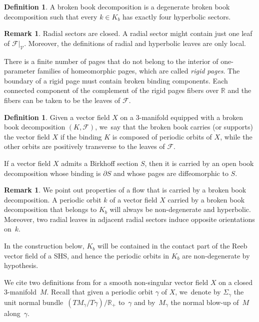 \documentclass[10pt]{amsart}
\newcommand{\threemanifold}{$3$\nobreakdash-mani\-fold\xspace}
\theoremstyle{definition}
\newtheorem{defi}[theorem]{Definition}
\newtheorem{Remark}[theorem]{Remark}
\newcommand\R{\mathbb{R}}
\begin{document}
\begin{defi}\label{defn:BBD2}
A broken book decomposition is a degenerate broken book decomposition such that every $k\in K_b$ has exactly four hyperbolic sectors.
\end{defi}

\begin{Remark}
Radial sectors are closed. A radial sector might contain just one leaf of $\mathcal{F}|_{\mathcal{V}}$. Moreover, the definitions of radial and hyperbolic leaves are only local.
\end{Remark}

There is a finite number of pages that do not belong to the interior of one-parameter families of homeomorphic pages, which are called \emph{rigid pages}. The boundary of a rigid page must contain broken binding components. Each connected component of the complement of the rigid pages fibers over $\mathbb{R}$ and the fibers can be taken to be the leaves of $\mathcal{F}$.

\begin{defi}
Given a vector field $X$ on a \threemanifold equipped with a broken book decomposition $(K,\mathcal{F})$, we~say that the broken book carries (or supports) the vector field $X$ if the binding $K$ is composed of periodic orbits of $X$, while the other orbits are positively transverse to the leaves of $\mathcal{F}$.
\end{defi}

If a vector field $X$ admits a Birkhoff section $S$, then it is carried by an open book decomposition whose binding is $\partial S$ and whose pages are diffeomorphic to $S$.

\begin{Remark}\label{rem:orientation}
We point out properties of a flow that is carried by a broken book decomposition. A periodic orbit $k$ of a vector field $X$ carried by a broken book decomposition that belongs to $K_b$ will always be non-degenerate and hyperbolic. Moreover, two radial leaves in adjacent radial sectors induce opposite orientations on~$k$.
\end{Remark}

In the construction below, $K_b$ will be contained in the contact part of the Reeb vector field of a SHS, and hence the periodic orbits in $K_b$ are non-degenerate by hypothesis.

We cite two definitions from \cite{CDR} for a smooth non-singular vector field $X$ on a closed \threemanifold~$M$. Recall that given a periodic orbit $\gamma$ of $X$, we~denote by $\Sigma_\gamma$ the unit normal bundle~$(TM_\gamma/T\gamma)/\R_+$ to~$\gamma$ and by~$M_\gamma$ the normal blow-up of~$M$ along~$\gamma$.
\end{document}
